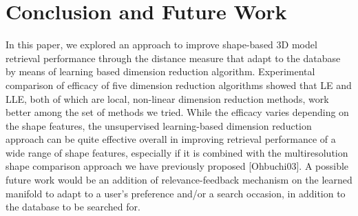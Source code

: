 \documentclass[journal]{IEEEtran}
\begin{document}
\section{Conclusion and Future Work}
In this paper, we explored an approach to improve
shape-based 3D model retrieval performance through
the distance measure that adapt to the database by
means of learning based dimension reduction algorithm.
Experimental comparison of efficacy of five dimension
reduction algorithms showed that LE and LLE, both of
which are local, non-linear dimension reduction
methods, work better among the set of methods we tried.
While the efficacy varies depending on the shape
features, the unsupervised learning-based dimension
reduction approach can be quite effective overall in
improving retrieval performance of a wide range of
shape features, especially if it is combined with the
multiresolution shape comparison approach we have
previously proposed [Ohbuchi03].
A possible future work would be an addition of
relevance-feedback mechanism on the learned manifold
to adapt to a user’s preference and/or a search occasion,
in addition to the database to be searched for. 

%
%

\end{document}
